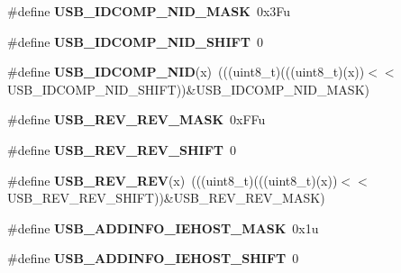 \begin{DoxyCompactItemize}
\item 
\#define {\bfseries U\+S\+B\+\_\+\+I\+D\+C\+O\+M\+P\+\_\+\+N\+I\+D\+\_\+\+M\+A\+SK}~0x3\+Fu\hypertarget{group__USB__Register__Masks_ga91e5cef0c6203ea503c01ecb0f392819}{}\label{group__USB__Register__Masks_ga91e5cef0c6203ea503c01ecb0f392819}

\item 
\#define {\bfseries U\+S\+B\+\_\+\+I\+D\+C\+O\+M\+P\+\_\+\+N\+I\+D\+\_\+\+S\+H\+I\+FT}~0\hypertarget{group__USB__Register__Masks_gabb5fe5f72dcf289ba2d624ed18f8f07a}{}\label{group__USB__Register__Masks_gabb5fe5f72dcf289ba2d624ed18f8f07a}

\item 
\#define {\bfseries U\+S\+B\+\_\+\+I\+D\+C\+O\+M\+P\+\_\+\+N\+ID}(x)~(((uint8\+\_\+t)(((uint8\+\_\+t)(x))$<$$<$U\+S\+B\+\_\+\+I\+D\+C\+O\+M\+P\+\_\+\+N\+I\+D\+\_\+\+S\+H\+I\+FT))\&U\+S\+B\+\_\+\+I\+D\+C\+O\+M\+P\+\_\+\+N\+I\+D\+\_\+\+M\+A\+SK)\hypertarget{group__USB__Register__Masks_ga00f75febd050c5d7be60f755cc502eae}{}\label{group__USB__Register__Masks_ga00f75febd050c5d7be60f755cc502eae}

\item 
\#define {\bfseries U\+S\+B\+\_\+\+R\+E\+V\+\_\+\+R\+E\+V\+\_\+\+M\+A\+SK}~0x\+F\+Fu\hypertarget{group__USB__Register__Masks_ga72a356a066674e41e3827b0ccb931e71}{}\label{group__USB__Register__Masks_ga72a356a066674e41e3827b0ccb931e71}

\item 
\#define {\bfseries U\+S\+B\+\_\+\+R\+E\+V\+\_\+\+R\+E\+V\+\_\+\+S\+H\+I\+FT}~0\hypertarget{group__USB__Register__Masks_gab058ebe4be52454e46ef15ce015ac5fd}{}\label{group__USB__Register__Masks_gab058ebe4be52454e46ef15ce015ac5fd}

\item 
\#define {\bfseries U\+S\+B\+\_\+\+R\+E\+V\+\_\+\+R\+EV}(x)~(((uint8\+\_\+t)(((uint8\+\_\+t)(x))$<$$<$U\+S\+B\+\_\+\+R\+E\+V\+\_\+\+R\+E\+V\+\_\+\+S\+H\+I\+FT))\&U\+S\+B\+\_\+\+R\+E\+V\+\_\+\+R\+E\+V\+\_\+\+M\+A\+SK)\hypertarget{group__USB__Register__Masks_ga30e7698a3bfac84ce89aee7d2d0498f4}{}\label{group__USB__Register__Masks_ga30e7698a3bfac84ce89aee7d2d0498f4}

\item 
\#define {\bfseries U\+S\+B\+\_\+\+A\+D\+D\+I\+N\+F\+O\+\_\+\+I\+E\+H\+O\+S\+T\+\_\+\+M\+A\+SK}~0x1u\hypertarget{group__USB__Register__Masks_gacb7c792034c73c4861bc8fba6ff4314f}{}\label{group__USB__Register__Masks_gacb7c792034c73c4861bc8fba6ff4314f}

\item 
\#define {\bfseries U\+S\+B\+\_\+\+A\+D\+D\+I\+N\+F\+O\+\_\+\+I\+E\+H\+O\+S\+T\+\_\+\+S\+H\+I\+FT}~0\hypertarget{group__USB__Register__Masks_gad256dcdfe8443877169b69dbcc8a041e}{}\label{group__USB__Register__Masks_gad256dcdfe8443877169b69dbcc8a041e}


\end{DoxyCompactItemize}

